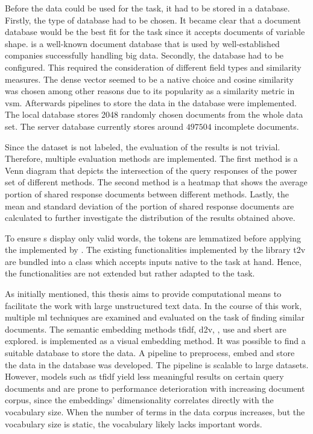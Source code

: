Before the data could be used for the task, it had to be stored in a database.
Firstly, the type of database had to be chosen.
It became clear that a document database would be the best fit for the task 
since it accepts documents of variable shape.
\databaseName{} is a well-known document database that is used by 
well-established companies successfully handling big data.
Secondly, the database had to be configured.
This required the consideration of different field types and similarity measures.
The dense vector seemed to be a native choice and cosine similarity was chosen 
among other reasons due to its popularity as a similarity metric in \ac{vsm}.
Afterwards pipelines to store the data in the database were implemented.
The local database stores 2048 randomly chosen documents from the whole data set.
The server database currently stores around $497504$ incomplete documents.

Since the dataset is not labeled, the evaluation of the results is not trivial.
Therefore, multiple evaluation methods are implemented.
The first method is a Venn diagram that depicts the intersection of the query responses of the power set of different methods.
The second method is a heatmap that shows the average portion of shared response documents between different methods.
Lastly, the mean and standard deviation of the portion of shared response documents are calculated 
to further investigate the distribution of the results obtained above.

To ensure \wordcloud{}s display only valid words, the tokens are lemmatized before applying the \wordcloud{} implemented by \citeauthor{wordcloud-dev}. 
The existing functionalities implemented by the library \ac{t2v} are bundled into a class 
which accepts inputs native to the task at hand.
Hence, the functionalities are not extended but rather adapted to the task.  


As initially mentioned, this thesis aims to provide computational means to facilitate the work with large unstructured text data.
In the course of this work, multiple \ac{ml} techniques are examined and evaluated on the task of finding similar documents.
The semantic embedding methods \ac{tfidf}, \ac{d2v}, \infersent{}, \ac{use} and \ac{sbert} are explored.
\eigendocs{} is implemented as a visual embedding method.
It was possible to find a suitable database to store the data.
A pipeline to preprocess, embed and store the data in the database was developed.
The pipeline is scalable to large datasets.
However, models such as \ac{tfidf} yield less meaningful results on certain query documents and 
are prone to performance deterioration with increasing document corpus, since the embeddings' 
dimensionality correlates directly with the vocabulary size.
When the number of terms in the data corpus increases, but the vocabulary size is static, 
the vocabulary likely lacks important words. 

